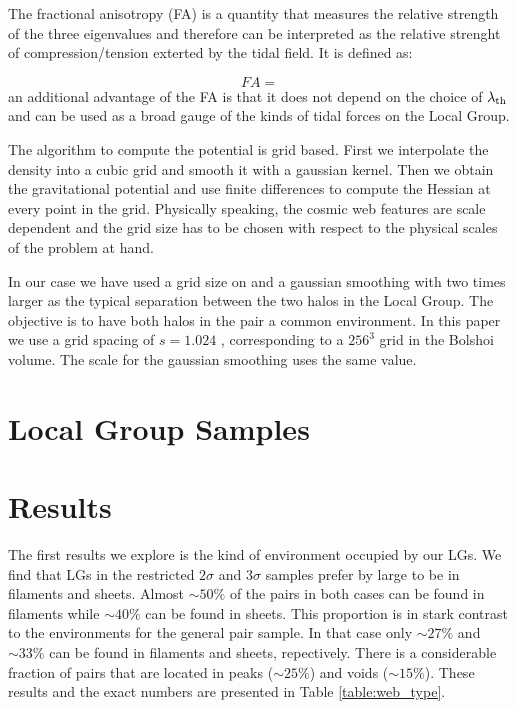 \documentclass{emulateapj}
\newcommand{\hMpc}{{\ifmmode{h^{-1}{\rm Mpc}}\else{$h^{-1}$Mpc }\fi}}
\begin{document}
The fractional anisotropy (FA) \citep{Libeskind2013} is a quantity
that measures the relative strength of the three eigenvalues and
therefore can be interpreted as the relative strenght of
compression/tension exterted by the tidal field. It is defined as:

\begin{equation}
FA=
\end{equation}
%
an additional advantage of the FA is that it does not depend on the
choice of $\lambda_{\rm th}$ and can be used as a broad gauge of the
kinds of tidal forces on the Local Group.


The algorithm to compute the potential is grid based. First we
interpolate the density into a cubic grid and smooth it with a
gaussian kernel. Then we obtain the gravitational potential and use
finite differences to compute the Hessian at every point in the
grid. Physically speaking, the cosmic web features are scale
dependent and the grid size has to be chosen with respect to the
physical scales of the problem at hand.

In our case we have used a grid size on and a gaussian smoothing with
two times larger as the typical separation between the two
halos in the Local Group. The objective is to have both halos in the
pair a common environment. In this paper we use a grid spacing of
$s=1.024$ \hMpc, corresponding to a $256^3$ grid in the Bolshoi
volume. The scale for the gaussian smoothing uses the same value.


\section{Local Group Samples}



\section{Results}
\label{sec:results}

The first results we explore is the kind of environment occupied by
our LGs. We find that LGs in the restricted $2\sigma$ and $3\sigma$
samples prefer by large to be in filaments and sheets. Almost $\sim 50\%$ of the
pairs in both cases can be found in filaments while $\sim 40\%$ can be
found in sheets. This proportion is in stark contrast to the
environments for the general pair sample. In that case only $\sim
27\%$ and $\sim 33\%$ can be found in filaments and sheets,
repectively. There is a considerable fraction of pairs that are
located in peaks ($\sim 25\%$) and voids ($\sim 15\%$). These results
and the exact numbers are presented in Table \ref{table:web_type}.
\end{document}
